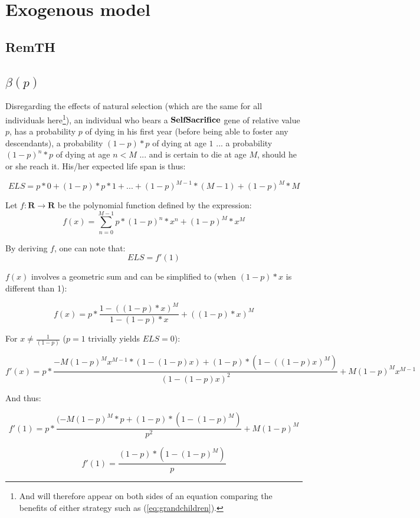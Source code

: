 \documentclass[a4paper,12pt]{report}
\begin{document}
\section{Exogenous model}
\subsection{RemTH}
\subsection{$\beta(p)$}
\label{beta}

Disregarding the effects of natural selection (which are the same for all individuals 
here\footnote{And will therefore appear on both sides of an equation comparing
the benefits of either strategy such as (\ref{eq:grandchildren}).}),
 an individual who bears a $\bf{SelfSacrifice}$ gene of relative value $p$, has a probability $p$ of dying in his first year
 (before being able to foster any descendants), a probability $(1-p)*p$ of dying at age $1$ ...
 a probability $(1-p)^{n}*p$ of dying at age $n<M$ ... and is certain to die at age $M$, should
 he or she reach it. His/her expected life span is thus:

 \[ ELS = p*0 + (1-p)*p*1 + ... + (1-p)^{M-1}*(M-1) + (1-p)^M*M \]

Let $f \colon \mathbf{R} \to \mathbf{R}$ be the polynomial function defined by the expression:
\[ f(x) = \sum_{n=0}^{M-1} p*(1-p)^n*x^n + (1-p)^M*x^M \]

By deriving $f$, one can note that:
\begin{equation}
    ELS = f'(1)
\label{eq_ELS_f}
\end{equation}

$f(x)$ involves a geometric sum and can be simplified to (when $(1-p)*x$ is different than 1):

\[ f(x) = p* \frac{1 - ((1-p)*x)^M}{1-(1-p)*x} + ((1-p)*x)^M \]

For $x\neq\frac{1}{(1-p)}$ ($p=1$ trivially yields $ELS=0$):

\[ f'(x) = p * \frac{-M(1-p)^Mx^{M-1}*(1-(1-p)x) + (1-p)*(1-((1-p)x)^M)}{(1-(1-p)x)^2} + M(1-p)^Mx^{M-1} \]

And thus:

\[f'(1) = p * \frac{(-M(1-p)^M*p + (1-p)*(1-(1-p)^M)}{p^2} + M(1-p)^M \]

\begin{equation}
    f'(1) = \frac{(1-p)*(1-(1-p)^M)}{p}
\label{eq_f'}
\end{equation}
\end{document}
